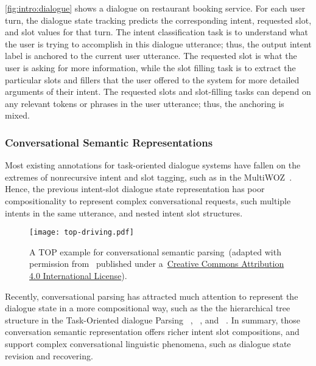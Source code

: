 \autoref{fig:intro:dialogue} shows a dialogue on restaurant booking
service. For each user turn, the dialogue state tracking predicts the
corresponding intent, requested slot, and slot values for that
turn. The intent classification task is to understand what the user is
trying to accomplish in this dialogue utterance; thus, the output
intent label is anchored to the current user utterance. The requested
slot is what the user is asking for more information, while the slot
filling task is to extract the particular slots and fillers that the
user offered to the system for more detailed arguments of their
intent. The requested slots and slot-filling tasks can depend on any
relevant tokens or phrases in the user utterance; thus, the anchoring
is mixed.

\subsubsection{Conversational Semantic Representations}
\label{ssec:bg:dialogue-rep}
Most existing annotations for task-oriented dialogue systems have fallen
on the extremes of nonrecursive intent and slot tagging, such as in
the MultiWOZ~\citep{budzianowski2018multiwoz}. Hence, the previous
intent-slot dialogue state representation has poor compositionality to
represent complex conversational requests, such multiple intents in the
same utterance, and nested intent slot structures.

\begin{figure}[!tbp]
\begin{center}
\texttt{[image: top-driving.pdf]}
\end{center}
\caption{\label{fig:bg:top} A TOP example for conversational semantic
  parsing~(adapted with permission
  from~\citet{gupta-etal-2018-semantic-parsing} published under
  a~\href{https://creativecommons.org/licenses/by/4.0/}{Creative
    Commons Attribution 4.0 International License}).}
\end{figure}
Recently, conversational parsing has attracted much attention to
represent the dialogue state in a more compositional way, such as the
the hierarchical tree structure in the Task-Oriented dialogue Parsing
~\cite[TOP,][]{gupta-etal-2018-semantic-parsing,aghajanyan2020conversational},
~\cite[TreeDST,][]{cheng2020conversational}, and
~\cite[Dataflow,][]{andreas2020task}. In summary, those conversation
semantic representation offers richer intent slot compositions, and
support complex conversational linguistic phenomena, such as dialogue
state revision and recovering.


